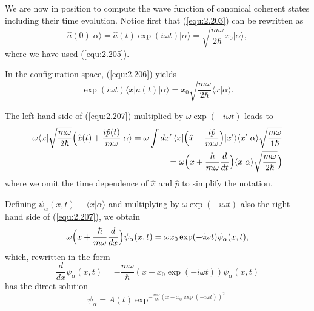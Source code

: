 We are now in position to compute the wave function of
canonical coherent states including their time evolution.
Notice first that (\ref{equ:2.203}) can be rewritten as
\begin{equation}
  \hat{a}(0) \vert \alpha \rangle = \hat{a}(t) \exp(i\omega
  t) \vert \alpha \rangle = \sqrt{\frac{m\omega}{2\hbar}}
  x_0 \vert \alpha \rangle,
  \label{equ:2.206}
\end{equation}
where we have used (\ref{equ:2.205}).

In the configuration space, (\ref{equ:2.206}) yields
\begin{equation}
  \exp(i\omega t) \langle x \vert a(t) \vert \alpha \rangle
  = x_0 \sqrt{\frac{m\omega}{2\hbar}} \langle x \vert \alpha
  \rangle .
  \label{equ:2.207}
\end{equation}

The left-hand side of (\ref{equ:2.207}) multiplied by $\omega
\exp(-i\omega t)$ leads to
\begin{align}
  \omega \langle x \vert \sqrt{\frac{m\omega}{2\hbar}}
  \Bigl(
    \hat{x}(t) + \frac{i\hat{p}(t)}{m\omega} \vert \alpha
    \rangle = \omega \int dx' \, \langle x \vert
    \Bigl(\hat{x}+\frac{i\hat{p}}{m\omega}\Bigr) \vert x'
    \rangle \langle x' \vert \alpha \rangle
    \sqrt{\frac{m\omega}{1\hbar}} \nonumber \\
    = \omega \Bigl(x +
    \frac{\hbar}{m\omega}{\frac{d}{dt}}\Bigr) \langle x
    \vert \alpha \rangle \sqrt{\frac{m\omega}{2\hbar}}
    \Bigr)\label{equ:2.208}
\end{align}
where we omit the time dependence of $\hat{x}$ and $\hat{p}$
to simplify the notation.

Defining $\psi_{\alpha} (x,t) \equiv \langle x \vert \alpha
\rangle$ and multiplying by $\omega \exp(-i\omega t)$ also
the right hand side of (\ref{equ:2.207}), we obtain
\begin{equation}
  \omega \Bigl(x + \frac{\hbar}{m\omega}\frac{d}{dx}\Bigr)
  \psi_{\alpha} (x,t) = \omega x_0 \exp(-i\omega t)
  \psi_{\alpha} (x,t),
  \label{equ:2.209}
\end{equation}
which, rewritten in the form
\begin{equation}
  \frac{d}{dx} \psi_{\alpha}(x,t) = - \frac{m\omega}{\hbar}
  (x - x_0 \exp(-i\omega t))\psi_{\alpha}(x,t)
  \label{equ:2.210}
\end{equation}
has the direct solution
\begin{equation}
  \psi_{\alpha} = A(t) \exp^{-\frac{m\omega}{2\hbar}(x-x_0
  \exp(-i\omega t))^2}
  \label{equ:2.211}
\end{equation}

